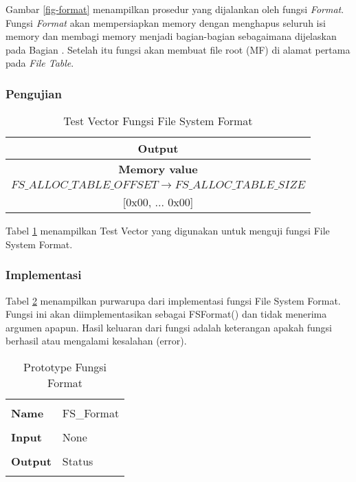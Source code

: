 Gambar \ref{fig-format} menampilkan prosedur yang dijalankan oleh fungsi {\em Format}. Fungsi {\em Format} akan mempersiapkan memory dengan menghapus seluruh isi memory dan membagi memory menjadi bagian-bagian sebagaimana dijelaskan pada Bagian . Setelah itu fungsi akan membuat file root (MF) di alamat pertama pada {\em File Table}. 

\subsubsection{Pengujian}

\begin{table}[!h]
  \centering
  \begin{tabular}{ | c | }
    \hline
    \bf{Output} \\
    \hline
    \bf{Memory value}\\
    \hline
    $FS\_ALLOC\_TABLE\_OFFSET \to FS\_ALLOC\_TABLE\_SIZE$ \\
    {[0x00, ... 0x00]} \\
    \hline
  \end{tabular}
  \caption{Test Vector Fungsi File System Format}
  \label{tabel-test-format}
\end{table}

Tabel \ref{tabel-test-format} menampilkan Test Vector yang digunakan untuk menguji fungsi File System Format.

\subsubsection{Implementasi}

Tabel \ref{tabel-format} menampilkan purwarupa dari implementasi fungsi File System Format. Fungsi ini akan diimplementasikan sebagai FSFormat() dan tidak menerima argumen apapun. Hasil keluaran dari fungsi adalah keterangan apakah fungsi berhasil atau mengalami kesalahan (error).

\begin{table}[htbp]
  \centering
  \begin{tabular}{p{2cm}p{8cm}}
    \hline\\
    {\bf Name} & FS\_Format\\
    \hline\\
    {\bf Input}  & None\\
    \hline\\
    {\bf Output} & Status\\
    \\
    \hline
  \end{tabular}
  \caption{Prototype Fungsi Format}
  \label{tabel-format}
\end{table}

